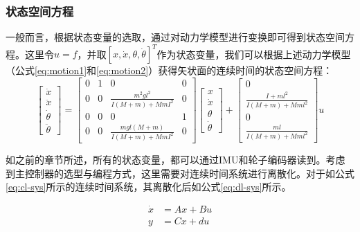 \subsubsection{状态空间方程}
一般而言，根据状态变量的选取，通过对动力学模型进行变换即可得到状态空间方程。这里令$u = f$，并取$[x,\dot{x}, \theta, \dot{\theta}]^T$作为状态变量，我们可以根据上述动力学模型（公式\ref{eq:motion1}和\ref{eq:motion2}）获得矢状面的连续时间的状态空间方程：
\begin{equation}
    \begin{bmatrix}
        \dot{x} \\
        \ddot{x} \\
        \dot{\theta} \\
        \ddot{\theta}
    \end{bmatrix}
    =
    \begin{bmatrix}
        0 & 1 & 0 & 0 \\
        0 & 0 & \frac{m^2gl^2}{I(M+m)+MmI^2} & 0 \\
        0 & 0 & 0 & 1 \\
        0 & 0 & \frac{mgl(M+m)}{I(M+m)+MmI^2} & 0
    \end{bmatrix}
    \begin{bmatrix}
        x \\
        \dot{x} \\
        \theta \\
        \dot{\theta}
    \end{bmatrix}
    +
    \begin{bmatrix}
        0 \\
        \frac{I+ml^2}{I(M+m)+Mml^2} \\
        0 \\
        \frac{ml}{I(M+m)+Mml^2}
    \end{bmatrix}
    u
\end{equation}

如之前的章节所述，所有的状态变量，都可以通过IMU和轮子编码器读到。考虑到主控制器的选型与编程方式，这里需要对连续时间系统进行离散化。对于如公式\ref{eq:cl-sys}所示的连续时间系统，其离散化后如公式\ref{eq:dl-sys}所示。

\begin{equation}
    \begin{aligned}
    \dot{x} & = Ax + Bu \\
    y & = Cx + du
    \end{aligned}
    \label{eq:cl-sys}
\end{equation}

